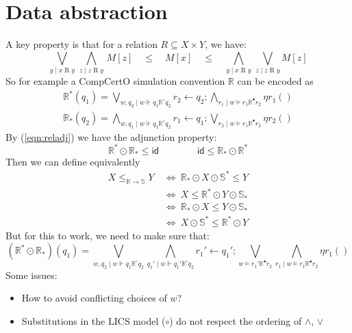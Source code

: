 \documentclass[11pt]{article}
\begin{document}


\newpage
\section{Data abstraction} %

A key property is that for a relation $R \subseteq X \times Y$, we have:
\begin{equation} \label{eqn:reladj}
  \bigvee_{y \mid x \mathrel{R} y} \,
  \bigwedge_{z \mid z \mathrel{R} y} \, M[z]
  \quad \le \quad M[x] \quad \le \quad
  \bigwedge_{y \mid x \mathrel{R} y} \,
    \bigvee_{z \mid z \mathrel{R} y} M[z]
\end{equation}
So for example a CompCertO simulation convention $\mathbb{R}$
can be encoded as
\begin{gather*}
  \mathbb{R}^*(q_1) =
    \bigvee_{w, q_2 \mid w \Vdash q_1 \mathbb{R}^\circ q_2}
      r_2 \leftarrow q_2 \mathbin;
          \bigwedge_{r_1 \mid w \vDash r_1 \mathbb{R}^\bullet r_2} \eta r_1 ()
\\[1ex]
  \mathbb{R}_*(q_2) =
    \bigwedge_{w, q_1 \mid w \Vdash q_1 \mathbb{R}^\circ q_2}
      r_1 \leftarrow q_1 \mathbin;
          \bigvee_{r_2 \mid w \vDash r_1 \mathbb{R}^\bullet r_2} \eta r_2 ()
\end{gather*}
By (\ref{eqn:reladj}) we have the adjunction property:
\[
  \mathbb{R}^* \odot \mathbb{R}_* \le \mathsf{id}
  \qquad \qquad
  \mathsf{id} \le \mathbb{R}_* \odot \mathbb{R}^*
\]
Then we can define equivalently
\begin{align*}
  X \le_{\mathbb{R} \rightarrow \mathbb{S}} Y &\:\Leftrightarrow\:
  \mathbb{R}_* \odot X \odot \mathbb{S}^* \le Y \\ &\:\Leftrightarrow\:
  X \le \mathbb{R}^* \odot Y \odot \mathbb{S}_* \\ &\:\Leftrightarrow\:
  \mathbb{R}_* \odot X \le Y \odot \mathbb{S}_* \\ &\:\Leftrightarrow\:
  X \odot \mathbb{S}^* \le \mathbb{R}^* \odot Y
\end{align*}
But for this to work,
we need to make sure that:
\[
  (\mathbb{R}^* \odot \mathbb{R}_*)(q_1) =
    \bigvee_{w, q_2 \mid w \Vdash q_1 \mathrel{\mathbb{R}^\circ} q_2}
    \bigwedge_{q_1' \mid w \Vdash q_1' \mathrel{\mathbb{R}^\circ} q_2}
      r_1' \leftarrow q_1' \mathbin;
          \bigvee_{w \vDash r_1' \mathrel{\mathbb{R}^\bullet} r_2}
          \bigwedge_{r_1 \mid w \vDash r_1 \mathrel{\mathbb{R}^\bullet r_2}} \eta r_1 ()
\]
Some issues:
\begin{itemize}
  \item How to avoid conflicting choices of $w$?
  \item Substitutions in the LICS model ($\circ$) do not respect
    the ordering of $\wedge$, $\vee$
\end{itemize}
\end{document}
